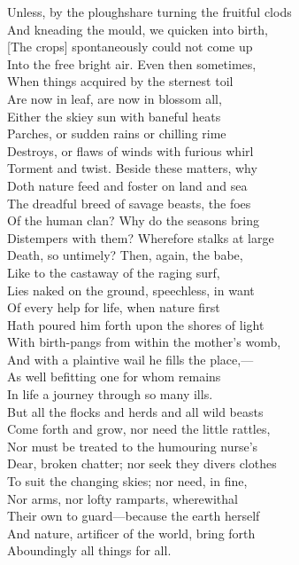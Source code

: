 Unless, by the ploughshare turning the fruitful clods\\
And kneading the mould, we quicken into birth,\\
{}[The crops] spontaneously could not come up\\
Into the free bright air. Even then sometimes,\\
When things acquired by the sternest toil\\
Are now in leaf, are now in blossom all,\\
Either the skiey sun with baneful heats\\
Parches, or sudden rains or chilling rime\\
Destroys, or flaws of winds with furious whirl\\
Torment and twist. Beside these matters, why\\
Doth nature feed and foster on land and sea\\
The dreadful breed of savage beasts, the foes\\
Of the human clan? Why do the seasons bring\\
Distempers with them? Wherefore stalks at large\\
Death, so untimely? Then, again, the babe,\\
Like to the castaway of the raging surf,\\
Lies naked on the ground, speechless, in want\\
Of every help for life, when nature first\\
Hath poured him forth upon the shores of light\\
With birth-pangs from within the mother's womb,\\
And with a plaintive wail he fills the place,—\\
As well befitting one for whom remains\\
In life a journey through so many ills.\\
But all the flocks and herds and all wild beasts\\
Come forth and grow, nor need the little rattles,\\
Nor must be treated to the humouring nurse's\\
Dear, broken chatter; nor seek they divers clothes\\
To suit the changing skies; nor need, in fine,\\
Nor arms, nor lofty ramparts, wherewithal\\
Their own to guard—because the earth herself\\
And nature, artificer of the world, bring forth\\
Aboundingly all things for all.


